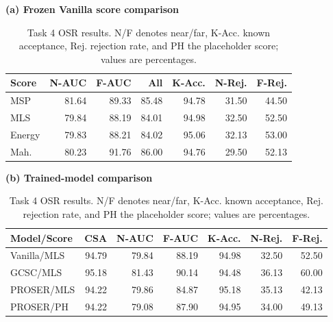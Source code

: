 \documentclass{article}
\begin{document}

\begin{table}[t]
\centering
\caption{Task 4 OSR results. N/F denotes near/far, K-Acc. known acceptance, Rej. rejection rate, and PH the placeholder score; values are percentages.}
\label{tab:task4_results}
\scriptsize
\setlength{\tabcolsep}{2.3pt}
\renewcommand{\arraystretch}{0.90}

\begin{minipage}[t]{0.485\textwidth}
\centering
\textbf{(a) Frozen Vanilla score comparison}

\vspace{0.2em}
\begin{tabular}{lrrrrrr}
\toprule
Score &
N-AUC &
F-AUC &
All &
K-Acc. &
N-Rej. &
F-Rej. \\
\midrule
MSP & 81.64 & 89.33 & 85.48 & 94.78 & 31.50 & 44.50 \\
MLS & 79.84 & 88.19 & 84.01 & 94.98 & 32.50 & 52.50 \\
Energy & 79.83 & 88.21 & 84.02 & 95.06 & 32.13 & 53.00 \\
Mah. & 80.23 & 91.76 & 86.00 & 94.76 & 29.50 & 52.13 \\
\bottomrule
\end{tabular}
\end{minipage}
\hfill
\begin{minipage}[t]{0.505\textwidth}
\centering
\textbf{(b) Trained-model comparison}

\vspace{0.2em}
\begin{tabular}{lrrrrrr}
\toprule
Model/Score &
CSA &
N-AUC &
F-AUC &
K-Acc. &
N-Rej. &
F-Rej. \\
\midrule
Vanilla/MLS & 94.79 & 79.84 & 88.19 & 94.98 & 32.50 & 52.50 \\
GCSC/MLS & 95.18 & 81.43 & 90.14 & 94.48 & 36.13 & 60.00 \\
PROSER/MLS & 94.22 & 79.86 & 84.87 & 95.18 & 35.13 & 42.13 \\
PROSER/PH & 94.22 & 79.08 & 87.90 & 94.95 & 34.00 & 49.13 \\
\bottomrule
\end{tabular}
\end{minipage}

\end{table}


\end{document}
